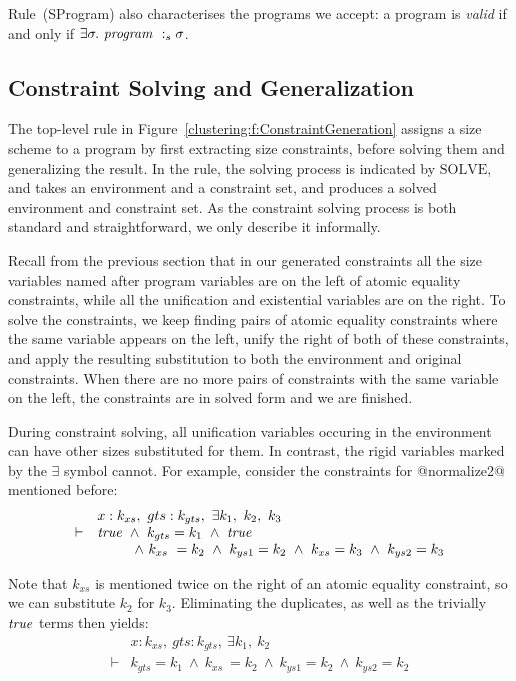 Rule~(SProgram) also characterises the programs we accept: a program is \emph{valid} if and only if $\exists \sigma.\ \mathit{program} ~:_{s} \sigma$. 

\subsection{Constraint Solving and Generalization}
The top-level rule in Figure~\ref{clustering:f:ConstraintGeneration} assigns a size scheme to a program by first extracting size constraints, before solving them and generalizing the result. In the rule, the solving process is indicated by $\textrm{SOLVE}$, and takes an environment and a constraint set, and produces a solved environment and constraint set. As the constraint solving process is both standard and straightforward, we only describe it informally.

Recall from the previous section that in our generated constraints all the size variables named after program variables are on the left of atomic equality constraints, while all the unification and existential variables are on the right. To solve the constraints, we keep finding pairs of atomic equality constraints where the same variable appears on the left, unify the right of both of these constraints, and apply the resulting substitution to both the environment and original constraints. When there are no more pairs of constraints with the same variable on the left, the constraints are in solved form and we are finished.

During constraint solving, all unification variables occuring in the environment can have other sizes substituted for them. In contrast, the rigid variables marked by the $\exists$ symbol cannot. For example, consider the constraints for @normalize2@ mentioned before:
$$
\begin{array}{ll}
       & x : k_{xs},~ gts : k_{gts},~ \exists k_1,~ k_2,~ k_3 
\\
\vdash & \mathit{true} 
        ~\wedge~  k_{gts} = k_1
        ~\wedge~  \mathit{true}
\\     &~~~~~~~~ 
          \wedge~  k_{xs}  ~= k_2
        ~ \wedge~  k_{ys1}  = k_2 
        ~ \wedge~  k_{xs}   = k_3
        ~ \wedge~  k_{ys2}  = k_3
\end{array}
$$

Note that $k_{xs}$ is mentioned twice on the right of an atomic equality constraint, so we can substitute $k_2$ for $k_3$. Eliminating the duplicates, as well as the trivially $\mathit{true}$ terms then yields:
$$
\begin{array}{ll}
       & x : k_{xs},~ gts : k_{gts},~ \exists k_1,~ k_2 
\\
\vdash & k_{gts} = k_1
        ~\wedge~  k_{xs}  ~= k_2
        ~\wedge~  k_{ys1}  = k_2 
        ~\wedge~  k_{ys2}  = k_2
\end{array}
$$

